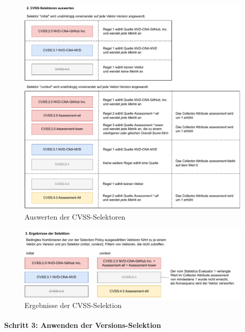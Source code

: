 \begin{figure}[htbp] %
    \centering
    \includegraphics[width=1\textwidth, keepaspectratio]{res/grafiken/cvss-selection-process-selection-2}
    \caption{Auswerten der CVSS-Selektoren}
    \label{fig:cvss-selection-process-selection-2}
\end{figure}

\begin{figure}[htbp] %
    \centering
    \includegraphics[width=1\textwidth, keepaspectratio]{res/grafiken/cvss-selection-process-selection-3}
    \caption{Ergebnisse der CVSS-Selektion}
    \label{fig:cvss-selection-process-selection-3}
\end{figure}

\paragraph{Schritt 3: Anwenden der Versions-Selektion} \label{par:projektbericht-loesungsweg-cvss-selection-example-step-4}

